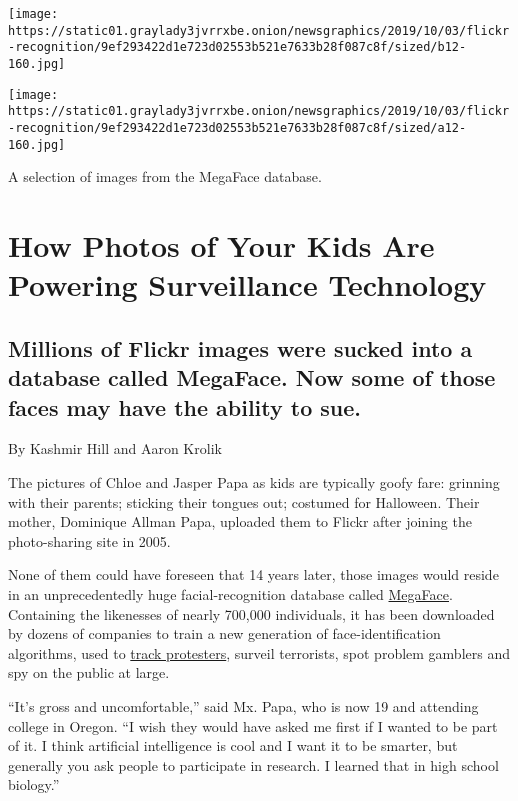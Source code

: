 \texttt{[image: https://static01.graylady3jvrrxbe.onion/newsgraphics/2019/10/03/flickr-recognition/9ef293422d1e723d02553b521e7633b28f087c8f/sized/b12-160.jpg]}

\texttt{[image: https://static01.graylady3jvrrxbe.onion/newsgraphics/2019/10/03/flickr-recognition/9ef293422d1e723d02553b521e7633b28f087c8f/sized/a12-160.jpg]}

A selection of images from the MegaFace database.

\hypertarget{how-photos-of-your-kids-are-powering-surveillance-technology-1}{%
\section{How Photos of Your Kids Are Powering Surveillance
Technology}\label{how-photos-of-your-kids-are-powering-surveillance-technology-1}}

\hypertarget{millions-of-flickr-images-were-sucked-into-a-database-called-megaface-now-some-of-those-faces-may-have-the-ability-to-sue}{%
\subsection{Millions of Flickr images were sucked into a database called
MegaFace. Now some of those faces may have the ability to
sue.}\label{millions-of-flickr-images-were-sucked-into-a-database-called-megaface-now-some-of-those-faces-may-have-the-ability-to-sue}}

By Kashmir Hill and Aaron Krolik

The pictures of Chloe and Jasper Papa as kids are typically goofy fare:
grinning with their parents; sticking their tongues out; costumed for
Halloween. Their mother, Dominique Allman Papa, uploaded them to Flickr
after joining the photo-sharing site in 2005.

None of them could have foreseen that 14 years later, those images would
reside in an unprecedentedly huge facial-recognition database called
\href{http://megaface.cs.washington.edu/}{MegaFace}. Containing the
likenesses of nearly 700,000 individuals, it has been downloaded by
dozens of companies to train a new generation of face-identification
algorithms, used to
\href{https://www.nytimes3xbfgragh.onion/2019/07/26/technology/hong-kong-protests-facial-recognition-surveillance.html}{track
protesters}, surveil terrorists, spot problem gamblers and spy on the
public at large.

``It's gross and uncomfortable,'' said Mx. Papa, who is now 19 and
attending college in Oregon. ``I wish they would have asked me first if
I wanted to be part of it. I think artificial intelligence is cool and I
want it to be smarter, but generally you ask people to participate in
research. I learned that in high school biology.''

